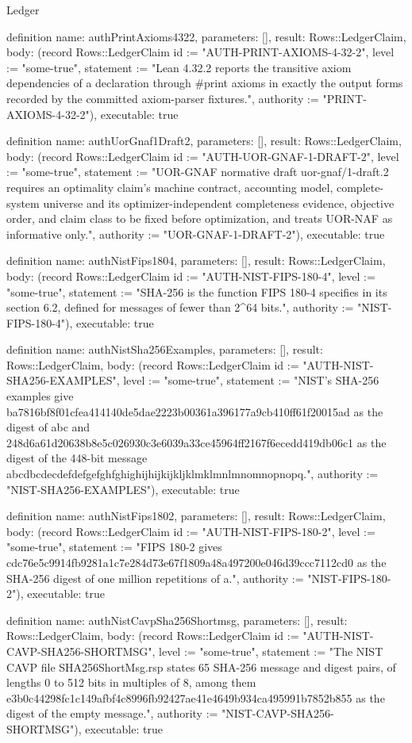 \begin{lexlean}{Ledger}
\begin{semanticmodule}
definition{
  name: authPrintAxioms4322,
  parameters: [],
  result: Rows::LedgerClaim,
  body: (record Rows::LedgerClaim {id := "AUTH-PRINT-AXIOMS-4-32-2", level := "some-true", statement := "Lean 4.32.2 reports the transitive axiom dependencies of a declaration through #print axioms in exactly the output forms recorded by the committed axiom-parser fixtures.", authority := "PRINT-AXIOMS-4-32-2"}),
  executable: true
}

definition{
  name: authUorGnaf1Draft2,
  parameters: [],
  result: Rows::LedgerClaim,
  body: (record Rows::LedgerClaim {id := "AUTH-UOR-GNAF-1-DRAFT-2", level := "some-true", statement := "UOR-GNAF normative draft uor-gnaf/1-draft.2 requires an optimality claim's machine contract, accounting model, complete-system universe and its optimizer-independent completeness evidence, objective order, and claim class to be fixed before optimization, and treats UOR-NAF as informative only.", authority := "UOR-GNAF-1-DRAFT-2"}),
  executable: true
}

definition{
  name: authNistFips1804,
  parameters: [],
  result: Rows::LedgerClaim,
  body: (record Rows::LedgerClaim {id := "AUTH-NIST-FIPS-180-4", level := "some-true", statement := "SHA-256 is the function FIPS 180-4 specifies in its section 6.2, defined for messages of fewer than 2^64 bits.", authority := "NIST-FIPS-180-4"}),
  executable: true
}

definition{
  name: authNistSha256Examples,
  parameters: [],
  result: Rows::LedgerClaim,
  body: (record Rows::LedgerClaim {id := "AUTH-NIST-SHA256-EXAMPLES", level := "some-true", statement := "NIST's SHA-256 examples give ba7816bf8f01cfea414140de5dae2223b00361a396177a9cb410ff61f20015ad as the digest of abc and 248d6a61d20638b8e5c026930c3e6039a33ce45964ff2167f6ecedd419db06c1 as the digest of the 448-bit message abcdbcdecdefdefgefghfghighijhijkijkljklmklmnlmnomnopnopq.", authority := "NIST-SHA256-EXAMPLES"}),
  executable: true
}

definition{
  name: authNistFips1802,
  parameters: [],
  result: Rows::LedgerClaim,
  body: (record Rows::LedgerClaim {id := "AUTH-NIST-FIPS-180-2", level := "some-true", statement := "FIPS 180-2 gives cdc76e5c9914fb9281a1c7e284d73e67f1809a48a497200e046d39ccc7112cd0 as the SHA-256 digest of one million repetitions of a.", authority := "NIST-FIPS-180-2"}),
  executable: true
}

definition{
  name: authNistCavpSha256Shortmsg,
  parameters: [],
  result: Rows::LedgerClaim,
  body: (record Rows::LedgerClaim {id := "AUTH-NIST-CAVP-SHA256-SHORTMSG", level := "some-true", statement := "The NIST CAVP file SHA256ShortMsg.rsp states 65 SHA-256 message and digest pairs, of lengths 0 to 512 bits in multiples of 8, among them e3b0c44298fc1c149afbf4c8996fb92427ae41e4649b934ca495991b7852b855 as the digest of the empty message.", authority := "NIST-CAVP-SHA256-SHORTMSG"}),
  executable: true
}


\end{semanticmodule}
\end{lexlean}
